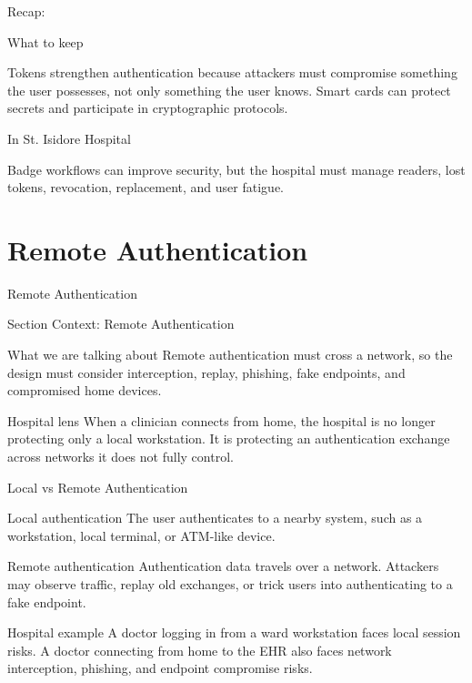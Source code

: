 \documentclass[presentation]{beamer}
\newcommand{\sectiontitleframe}[1]{
\begin{frame}[plain,c]
\begin{center}
{\usebeamerfont{title}\usebeamercolor[fg]{title}#1}
\end{center}
\end{frame}
}
\newcommand{\scenario}{St. Isidore Hospital}
\newcommand{\takeawaysframe}[2]{
  \begin{frame}[c]{Recap: \insertsection}
    \begin{block}{What to keep}
      #1
    \end{block}
    \begin{exampleblock}{In \scenario}
      #2
    \end{exampleblock}
  \end{frame}
}
\begin{document}
\takeawaysframe{
  Tokens strengthen authentication because attackers must compromise something the user possesses, not only something the user knows. Smart cards can protect secrets and participate in cryptographic protocols.
}{
  Badge workflows can improve security, but the hospital must manage readers, lost tokens, revocation, replacement, and user fatigue.
}

\section{Remote Authentication}
\sectiontitleframe{Remote Authentication}

\begin{frame}[c]{Section Context: Remote Authentication}
\begin{block}{What we are talking about}
Remote authentication must cross a network, so the design must consider interception, replay,
phishing, fake endpoints, and compromised home devices.
\end{block}

\begin{exampleblock}{Hospital lens}
When a clinician connects from home, the hospital is no longer protecting only a local workstation.
It is protecting an authentication exchange across networks it does not fully control.
\end{exampleblock}
\end{frame}

\begin{frame}[c]{Local vs Remote Authentication}
  \begin{block}{Local authentication}
    The user authenticates to a nearby system, such as a workstation, local terminal, or ATM-like device.
  \end{block}

  \begin{block}{Remote authentication}
    Authentication data travels over a network. Attackers may observe traffic, replay old exchanges, or trick users into authenticating to a fake endpoint.
  \end{block}

  \begin{exampleblock}{Hospital example}
    A doctor logging in from a ward workstation faces local session risks. A doctor connecting from home to the EHR also faces network interception, phishing, and endpoint compromise risks.
  \end{exampleblock}
\end{frame}
\end{document}
